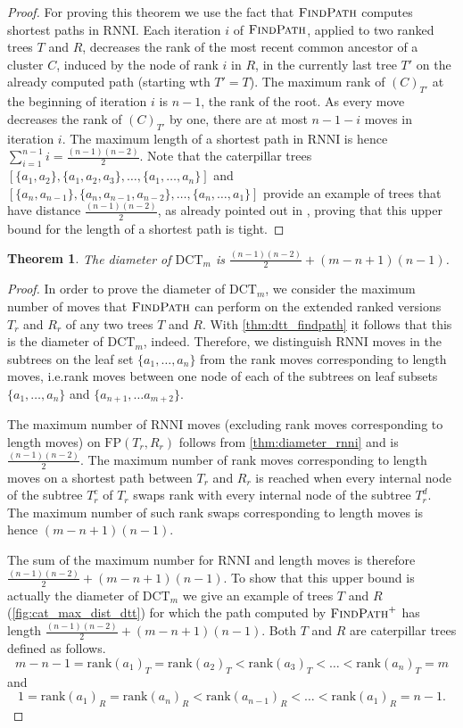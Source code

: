 \documentclass[11pt]{amsart}
\newtheorem{theorem}{Theorem}
\newcommand{\rnni}{\mathrm{RNNI}}
\newcommand{\findpath}{\textsc{FindPath}}
\newcommand{\rank}{\mathrm{rank}}
\newcommand{\fp}{\mathrm{FP}}
\newcommand{\dct}{\mathrm{DCT}}
\providecommand{\DIFaddtex}[1]{{\protect\color{blue}\uwave{#1}}} %
\providecommand{\DIFaddbegin}{} %
\providecommand{\DIFaddend}{} %
\providecommand{\DIFadd}[1]{\texorpdfstring{\DIFaddtex{#1}}{#1}} %
\newcommand{\DIFaddincludegraphics}[2][]{{\color{blue}\fbox{\DIFOincludegraphics[#1]{#2}}}} %
\DeclareRobustCommand{\DIFaddbegin}{\DIFOaddbegin \let\includegraphics\DIFaddincludegraphics} %
\DeclareRobustCommand{\DIFaddend}{\DIFOaddend \let\includegraphics\DIFOincludegraphics} %
\begin{document}
\begin{proof}
	For proving this theorem we use the fact that $\findpath$ computes shortest paths in $\rnni$.
	Each iteration $i$ of $\findpath$, applied to two ranked trees $T$ and $R$, decreases the rank of the most recent common ancestor of a cluster $C$, induced by the node of rank $i$ in $R$, in the currently last tree $T'$ on the already computed path (starting wth $T' = T$).
	The maximum rank of $(C)_{T'}$ at the beginning of iteration $i$ is $n-1$, the rank of the root.
	As every move decreases the rank of $(C)_{T'}$ by one, there are at most $n-1-i$ moves in iteration $i$.
	The maximum length of a shortest path in $\rnni$ is hence $\sum \limits_{i = 1}^{n-1} i = \frac{(n-1)(n-2)}{2}$.
	Note that the caterpillar trees $[\{a_1, a_2\}, \{a_1, a_2, a_3\}, \ldots, \{a_1, \ldots, a_n\}]$ and $[\{a_n, a_{n-1}\}, \{a_n, a_{n-1}, a_{n-2}\}, \ldots, \{a_n, \ldots, a_1\}]$ provide an example of trees that have distance $\frac{(n-1)(n-2)}{2}$, as already pointed out in \autocite[Corollary 1]{Collienne2021}, proving that this upper bound for the length of a shortest path is tight.
\end{proof}

\begin{theorem}
	The diameter of $\dct_m$ is $\frac{(n-1)(n-2)}{2} + (m-n+1)(n-1)$.
	\label{thm:dtt_diameter}
\end{theorem}

\begin{proof}
	In order to prove the diameter of $\dct_m$, we consider the maximum number of moves that $\findpath$ can perform on the extended ranked versions $T_r$ and $R_r$ of any two trees $T$ and $R$.
	With \autoref{thm:dtt_findpath} it follows that this is the diameter of $\dct_m$, indeed.
	Therefore, we distinguish $\rnni$ moves in the subtrees on the leaf set $\{a_1, \ldots, a_n\}$ from the rank moves corresponding to length moves, i.e.\DIFaddbegin \DIFadd{\ }\DIFaddend rank moves between one node of each of the subtrees on leaf subsets $\{a_1, \ldots, a_n\}$ and $\{a_{n+1}, \ldots a_{m+2}\}$.

	The maximum number of $\rnni$ moves (excluding rank moves corresponding to length moves) on $\fp(T_r,R_r)$ follows from \autoref{thm:diameter_rnni} and is $\frac{(n-1)(n-2)}{2}$.
	The maximum number of rank moves corresponding to length moves on a shortest path between $T_r$ and $R_r$ is reached when every internal node of the subtree $T_r^c$ of $T_r$ swaps rank with every internal node of the subtree $T_r^d$.
	The maximum number of such rank swaps corresponding to length moves is hence $(m-n+1)(n-1)$.

	The sum of the maximum number for $\rnni$ and length moves is therefore $\frac{(n-1)(n-2)}{2} + (m-n+1)(n-1)$.
	To show that this upper bound is actually the diameter of $\dct_m$ we give an example of trees $T$ and $R$ (\autoref{fig:cat_max_dist_dtt}) for which the path computed by $\findpath^+$ has length $\frac{(n-1)(n-2)}{2} + (m-n+1)(n-1)$.
	Both $T$ and $R$ are caterpillar trees defined as follows.
	\[m-n-1 = \rank(a_1)_T = \rank(a_2)_T < \rank(a_3)_T < \ldots < \rank(a_n)_T = m\]
	and
	\[1 = \rank(a_1)_R = \rank(a_n)_R < \rank(a_{n-1})_R < \ldots < \rank(a_1)_R = n-1.\]
\end{proof}
\end{document}
